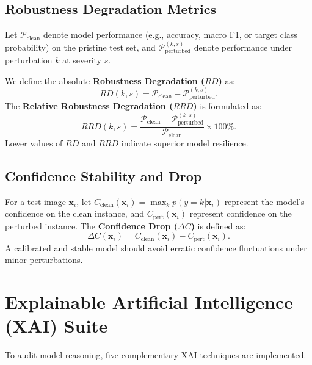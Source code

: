 \documentclass[conference]{IEEEtran}
\begin{document}
\subsection{Robustness Degradation Metrics}
Let $\mathcal{P}_{\text{clean}}$ denote model performance (e.g., accuracy, macro F1, or target class probability) on the pristine test set, and $\mathcal{P}_{\text{perturbed}}^{(k, s)}$ denote performance under perturbation $k$ at severity $s$. 

We define the absolute \textbf{Robustness Degradation ($RD$)} as:
\begin{equation}
RD(k, s) = \mathcal{P}_{\text{clean}} - \mathcal{P}_{\text{perturbed}}^{(k, s)}.
\end{equation}
The \textbf{Relative Robustness Degradation ($RRD$)} is formulated as:
\begin{equation}
RRD(k, s) = \frac{\mathcal{P}_{\text{clean}} - \mathcal{P}_{\text{perturbed}}^{(k, s)}}{\mathcal{P}_{\text{clean}}} \times 100\%.
\end{equation}
Lower values of $RD$ and $RRD$ indicate superior model resilience.

\subsection{Confidence Stability and Drop}
For a test image $\mathbf{x}_i$, let $C_{\text{clean}}(\mathbf{x}_i) = \max_k p(y=k|\mathbf{x}_i)$ represent the model's confidence on the clean instance, and $C_{\text{pert}}(\mathbf{x}_i)$ represent confidence on the perturbed instance. The \textbf{Confidence Drop ($\Delta C$)} is defined as:
\begin{equation}
\Delta C(\mathbf{x}_i) = C_{\text{clean}}(\mathbf{x}_i) - C_{\text{pert}}(\mathbf{x}_i).
\end{equation}
A calibrated and stable model should avoid erratic confidence fluctuations under minor perturbations.

\section{Explainable Artificial Intelligence (XAI) Suite}
\label{sec:xai}

To audit model reasoning, five complementary XAI techniques are implemented.
\end{document}
